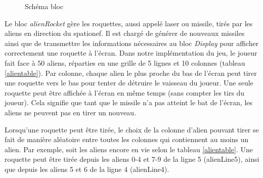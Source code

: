 \documentclass[french]{nakrule}
\begin{document}
\begin{figure}
\caption{Schéma bloc}
\label{alienRocketBloc}
\end{figure}

Le bloc \emph{alienRocket} gère les roquettes, aussi appelé laser ou missile, tirés par
les aliens en direction du spationef. Il est chargé de générer de nouveaux
missiles ainsi que de transmettre les informations nécessaires au bloc \emph{Display} pour afficher
correctement une roquette à l'écran.
Dans notre implémentation du jeu, le joueur fait face à 50 aliens, réparties en
une grille de 5 lignes et 10 colonnes (tableau \ref{alientable}). Par colonne,
chaque alien le plus proche du bas de l'écran peut tirer une roquette vers le
bas pour tenter de détruire le vaisseau du joueur. Une seule roquette peut être
affichée à l'écran en même temps (sans compter les tirs du joueur). Cela signifie
que tant que le missile n'a pas atteint le bat de l'écran, les aliens ne peuvent
pas en tirer un nouveau.

Lorsqu'une roquette peut être tirée, le choix de la colonne d'alien pouvant tirer
se fait de manière aléatoire entre toutes les colonnes qui contiennent au moins un
alien. Par exemple, soit les aliens encore en vie selon le tableau
\ref{alientable}. Une roquette peut être tirée depuis les aliens 0-4 et 7-9 de la
ligne 5 (alienLine5), ainsi que depuis les aliens 5 et 6 de la ligne 4 (alienLine4).
\end{document}
